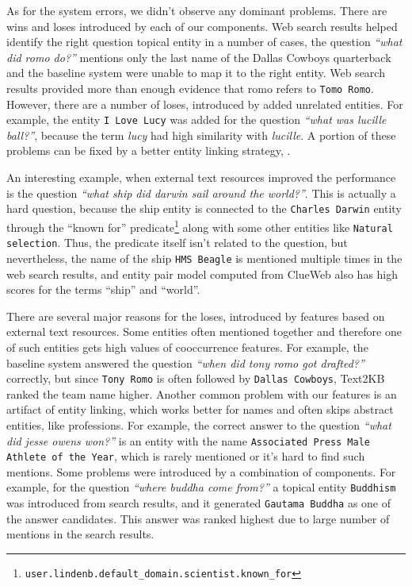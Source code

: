 As for the system errors, we didn't observe any dominant problems.
There are wins and loses introduced by each of our components.
Web search results helped identify the right question topical entity in a number of cases, \eg the question \textit{``what did romo do?''} mentions only the last name of the Dallas Cowboys quarterback and the baseline system were unable to map it to the right entity.
Web search results provided more than enough evidence that romo refers to \texttt{Tomo Romo}.
However, there are a number of loses, introduced by added unrelated entities.
For example, the entity \texttt{I Love Lucy} was added for the question \textit{``what was lucille ball?''}, because the term \textit{lucy} had high similarity with \textit{lucille}.
A portion of these problems can be fixed by a better entity linking strategy, \eg \cite{SMAPH_ERD:2014}.


An interesting example, when external text resources improved the performance is the question \textit{``what ship did darwin sail around the world?''}.
This is actually a hard question, because the ship entity is connected to the \texttt{Charles Darwin} entity through the ``known for'' predicate\footnote{\texttt{user.lindenb.default\_domain.scientist.known\_for}} along with some other entities like \texttt{Natural selection}.
Thus, the predicate itself isn't related to the question, but nevertheless, the name of the ship \texttt{HMS Beagle} is mentioned multiple times in the web search results, and entity pair model computed from ClueWeb also has high scores for the terms ``ship'' and ``world''.

There are several major reasons for the loses, introduced by features based on external text resources.
Some entities often mentioned together and therefore one of such entities gets high values of cooccurrence features.
For example, the baseline system answered the question \textit{``when did tony romo got drafted?''} correctly, but since \texttt{Tony Romo} is often followed by \texttt{Dallas Cowboys}, Text2KB ranked the team name higher.
Another common problem with our features is an artifact of entity linking, which works better for names and often skips abstract entities, like professions.
For example, the correct answer to the question \textit{``what did jesse owens won?''} is an entity with the name \texttt{Associated Press Male Athlete of the Year}, which is rarely mentioned or it's hard to find such mentions.
Some problems were introduced by a combination of components.
For example, for the question \textit{``where buddha come from?''} a topical entity \texttt{Buddhism} was introduced from search results, and it generated \texttt{Gautama Buddha} as one of the answer candidates.
This answer was ranked highest due to large number of mentions in the search results.

